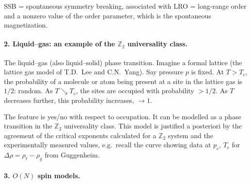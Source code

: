 SSB = spontaneous symmetry breaking, associated with LRO = long-range order and a nonzero
value of the order parameter, which is the spontaneous magnetization.

\paragraph{2. Liquid--gas: an example of the \texorpdfstring{$\mathbb{Z}_2$}{Z2} universality class.}

The liquid--gas (also liquid--solid) phase transition. Imagine a formal lattice (the
lattice gas model of T.D.~Lee and C.N.~Yang). Say pressure $p$ is fixed. At $T>T_c$, the
probability of a molecule or atom being present at a site in the lattice gas is
$1/2$: random. As $T\searrow T_c$, the sites are occupied with probability $>1/2$.
As $T$ decreases further, this probability increases, $\to 1$.

\begin{diagram}
\end{diagram}

The feature is yes/no with respect to occupation. It can be modelled as a phase
transition in the $\mathbb{Z}_2$ universality class. This model is justified a
posteriori by the agreement of the critical exponents calculated for a $\mathbb{Z}_2$
system and the experimentally measured values, e.g.\ recall the curve showing data at
$p_c$, $T_c$ for $\Delta\rho = \rho_\ell-\rho_g$ from Guggenheim.

\paragraph{3. \texorpdfstring{$O(N)$}{O(N)} spin models.}

